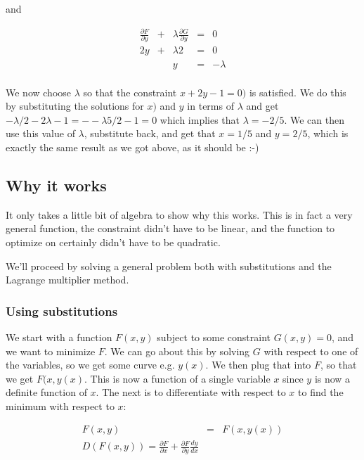 \documentclass[a4, 12pt, english, USenglish]{scrreprt}
\begin{document}
and 

\[
\begin{array}{lclcl}
\frac{\partial{F}}{\partial{y}} &+& \lambda \frac{\partial{G}}{\partial{y}} &=& 0 \\
2y &+& \lambda 2 &=& 0\\
&& y&=& - \lambda\\
\end{array}
\]

We now choose \(\lambda\) so that the constraint \(x + 2y -1 = 0)\) is
satisfied.  We do this by substituting the solutions for \(x)\) and
\(y\) in terms of \(\lambda\) and get \(-\lambda/2 - 2\lambda -1 = -
-\lambda 5/2 -1 = 0\) which implies that \(\lambda = -2/5\).  We can
then use this value of \(\lambda\), substitute back, and get that
\(x=1/5\) and \(y = 2/5\), which is exactly the same result as we got
above, as it should be :-)

\subsection{Why it works}

It only takes a little bit of algebra to show why this works.  This is
in fact a very general function, the constraint didn't have to be
linear, and the function to optimize on certainly didn't have to be quadratic.

We'll proceed by solving a general problem both with substitutions and
the Lagrange multiplier method. 

\subsubsection{Using substitutions}

  We start with a function \(F(x,y)\) subject to some constraint
  \(G(x,y) = 0\), and we want to minimize \(F\).  We can go about this
  by solving \(G\) with respect to one of the variables, so we get
  some curve e.g. \(y(x)\). We then plug that into \(F\), so that we
  get \(F(x,y(x)\).  This is now a function of a single variable \(x\)
  since \(y\) is now a definite function of \(x\).  The next is to
  differentiate with respect to \(x\) to find the minimum with respect
  to \(x\):

\[
\begin{array}{lcl}
F(x,y)&=& F(x,y(x)) \\
D(F(x,y)) = \frac{\partial F}{\partial x} + \frac{\partial F}{\partial  y}\frac{d y}{d x}
\end{array}
\]
\end{document}
